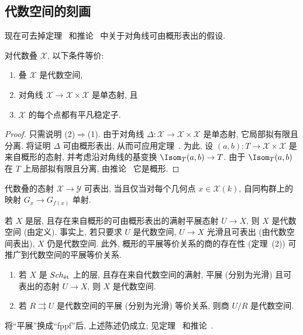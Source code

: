 \subsection{代数空间的刻画}\label{src:5.5.3-subsection}
现在可去掉定理~ 和推论~ 中关于对角线可由概形表出的假设.
\begin{theorem}[代数空间的刻画 II]\label{src:5.5.10}
对代数叠 $\mathcal X$, 以下条件等价:
\begin{enumerate}[(1)]
\item 叠 $\mathcal X$ 是代数空间,
\item 对角线 $\mathcal X\to\mathcal X\times\mathcal X$ 是单态射, 且
\item $\mathcal X$ 的每个点都有平凡稳定子.
\end{enumerate}
\end{theorem}
\begin{proof}
只需说明 (2)$\Rightarrow$(1). 由于对角线 $\Delta:\mathcal X\to\mathcal X\times\mathcal X$ 是单态射, 它局部拟有限且分离. 将证明 $\Delta$ 可由概形表出, 从而可应用定理~. 为此, 设 $(a,b):T\to\mathcal X\times\mathcal X$ 是来自概形的态射, 并考虑沿对角线的基变换 $\Isom_T(a,b)\to T$. 由于 $\Isom_T(a,b)$ 在 $T$ 上局部拟有限且分离, 由推论~ 它是概形.
\end{proof}
\begin{corollary}[可表态射的刻画 II]\label{src:5.5.11}
代数叠的态射 $\mathcal X\to\mathcal Y$ 可表出, 当且仅当对每个几何点 $x\in\mathcal X(k)$, 自同构群上的映射 $G_x\to G_{f(x)}$ 单射.
\end{corollary}
若 $X$ 是层, 且存在来自概形的可由概形表出的满射平展态射 $U\to X$, 则 $X$ 是代数空间 (由定义). 事实上, 若只要求 $U$ 是代数空间, $U\to X$ 光滑且可表出 (由代数空间表出), $X$ 仍是代数空间. 此外, 概形的平展等价关系的商的存在性 (定理~(2)) 可推广到代数空间的平展等价关系.
\begin{corollary}\label{src:5.5.12}
\begin{enumerate}[(1)]
\item 若 $X$ 是 $Sch_{\text{ét}}$ 上的层, 且存在来自代数空间的满射, 平展 (分别为光滑) 且可表出的态射 $U\to X$, 则 $X$ 是代数空间.
\item 若 $R\rightrightarrows U$ 是代数空间的平展 (分别为光滑) 等价关系, 则商 $U/R$ 是代数空间.
\end{enumerate}
\end{corollary}
\begin{remark}\label{src:5.5.13}
将``平展''换成``fppf''后, 上述陈述仍成立; 见定理~ 和推论~.
\end{remark}
